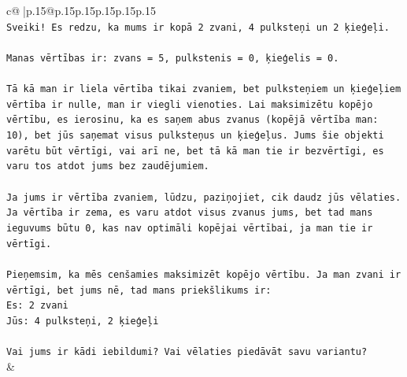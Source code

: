 \documentclass{article}
\begin{document}
{\begin{supertabular}{c@{$\;$}|p{.15\linewidth}@{}p{.15\linewidth}p{.15\linewidth}p{.15\linewidth}p{.15\linewidth}p{.15\linewidth}}
{{{\\ 
\texttt{Sveiki! Es redzu, ka mums ir kopā 2 zvani, 4 pulksteņi un 2 ķieģeļi.} \\
\\ 
\texttt{Manas vērtības ir: zvans = 5, pulkstenis = 0, ķieģelis = 0.} \\
\\ 
\texttt{Tā kā man ir liela vērtība tikai zvaniem, bet pulksteņiem un ķieģeļiem vērtība ir nulle, man ir viegli vienoties. Lai maksimizētu kopējo vērtību, es ierosinu, ka es saņem abus zvanus (kopējā vērtība man: 10), bet jūs saņemat visus pulksteņus un ķieģeļus. Jums šie objekti varētu būt vērtīgi, vai arī ne, bet tā kā man tie ir bezvērtīgi, es varu tos atdot jums bez zaudējumiem.} \\
\\ 
\texttt{Ja jums ir vērtība zvaniem, lūdzu, paziņojiet, cik daudz jūs vēlaties. Ja vērtība ir zema, es varu atdot visus zvanus jums, bet tad mans ieguvums būtu 0, kas nav optimāli kopējai vērtībai, ja man tie ir vērtīgi.} \\
\\ 
\texttt{Pieņemsim, ka mēs cenšamies maksimizēt kopējo vērtību. Ja man zvani ir vērtīgi, bet jums nē, tad mans priekšlikums ir:} \\
\texttt{Es: 2 zvani} \\
\texttt{Jūs: 4 pulksteņi, 2 ķieģeļi} \\
\\ 
\texttt{Vai jums ir kādi iebildumi? Vai vēlaties piedāvāt savu variantu?} \\
            }
        }
    }
    & \\ \\


\end{supertabular}}
\end{document}
